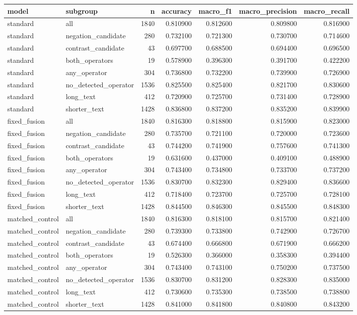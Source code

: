 \begin{tabular}{llrrrrr}
\toprule
model & subgroup & n & accuracy & macro\_f1 & macro\_precision & macro\_recall \\
\midrule
standard & all & 1840 & 0.810900 & 0.812600 & 0.809800 & 0.816900 \\
standard & negation\_candidate & 280 & 0.732100 & 0.721300 & 0.730700 & 0.714600 \\
standard & contrast\_candidate & 43 & 0.697700 & 0.688500 & 0.694400 & 0.696500 \\
standard & both\_operators & 19 & 0.578900 & 0.396300 & 0.391700 & 0.422200 \\
standard & any\_operator & 304 & 0.736800 & 0.732200 & 0.739900 & 0.726900 \\
standard & no\_detected\_operator & 1536 & 0.825500 & 0.825400 & 0.821700 & 0.830600 \\
standard & long\_text & 412 & 0.720900 & 0.725700 & 0.731400 & 0.728900 \\
standard & shorter\_text & 1428 & 0.836800 & 0.837200 & 0.835200 & 0.839900 \\
fixed\_fusion & all & 1840 & 0.816300 & 0.818800 & 0.815900 & 0.823000 \\
fixed\_fusion & negation\_candidate & 280 & 0.735700 & 0.721100 & 0.720000 & 0.723600 \\
fixed\_fusion & contrast\_candidate & 43 & 0.744200 & 0.741900 & 0.757600 & 0.741300 \\
fixed\_fusion & both\_operators & 19 & 0.631600 & 0.437000 & 0.409100 & 0.488900 \\
fixed\_fusion & any\_operator & 304 & 0.743400 & 0.734800 & 0.733700 & 0.737200 \\
fixed\_fusion & no\_detected\_operator & 1536 & 0.830700 & 0.832300 & 0.829400 & 0.836600 \\
fixed\_fusion & long\_text & 412 & 0.718400 & 0.723700 & 0.725700 & 0.728100 \\
fixed\_fusion & shorter\_text & 1428 & 0.844500 & 0.846300 & 0.845500 & 0.848300 \\
matched\_control & all & 1840 & 0.816300 & 0.818100 & 0.815700 & 0.821400 \\
matched\_control & negation\_candidate & 280 & 0.739300 & 0.733800 & 0.742900 & 0.726700 \\
matched\_control & contrast\_candidate & 43 & 0.674400 & 0.666800 & 0.671900 & 0.666200 \\
matched\_control & both\_operators & 19 & 0.526300 & 0.366000 & 0.358300 & 0.394400 \\
matched\_control & any\_operator & 304 & 0.743400 & 0.743100 & 0.750200 & 0.737500 \\
matched\_control & no\_detected\_operator & 1536 & 0.830700 & 0.831200 & 0.828300 & 0.835000 \\
matched\_control & long\_text & 412 & 0.730600 & 0.735300 & 0.738500 & 0.738800 \\
matched\_control & shorter\_text & 1428 & 0.841000 & 0.841800 & 0.840800 & 0.843200 \\
\bottomrule
\end{tabular}
